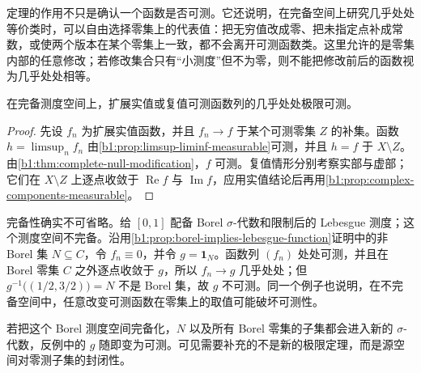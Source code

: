 定理的作用不只是确认一个函数是否可测。它还说明，在完备空间上研究几乎处处等价类时，可以自由选择零集上的代表值：把无穷值改成零、把未指定点补成常数，或使两个版本在某个零集上一致，都不会离开可测函数类。这里允许的是零集内部的任意修改；若修改集合只有“小测度”但不为零，则不能把修改前后的函数视为几乎处处相等。

\begin{corollary}
\label{b1:cor:ae-limit-measurable}
在完备测度空间上，扩展实值或复值可测函数列的几乎处处极限可测。
\end{corollary}
\begin{proof}
先设 \(f_n\) 为扩展实值函数，并且 \(f_n\to f\) 于某个可测零集 \(Z\) 的补集。函数
\(h=\limsup_nf_n\) 由\cref{b1:prop:limsup-liminf-measurable}可测，并且 \(h=f\) 于 \(X\setminus Z\)。由\cref{b1:thm:complete-null-modification}，\(f\) 可测。复值情形分别考察实部与虚部；它们在 \(X\setminus Z\) 上逐点收敛于 \(\operatorname{Re}f\) 与 \(\operatorname{Im}f\)，应用实值结论后再用\cref{b1:prop:complex-components-measurable}。
\end{proof}

完备性确实不可省略。给 \([0,1]\) 配备 Borel \(\sigma\)-代数和限制后的 Lebesgue 测度；这个测度空间不完备。沿用\cref{b1:prop:borel-implies-lebesgue-function}证明中的非 Borel 集 \(N\subseteq C\)，令 \(f_n\equiv0\)，并令 \(g=\mathbf 1_N\)。函数列 \((f_n)\) 处处可测，并且在 Borel 零集 \(C\) 之外逐点收敛于 \(g\)，所以 \(f_n\to g\) 几乎处处；但 \(g^{-1}\bigl((1/2,3/2)\bigr)=N\) 不是 Borel 集，故 \(g\) 不可测。同一个例子也说明，在不完备空间中，任意改变可测函数在零集上的取值可能破坏可测性。

\ProseParagraphBreak

若把这个 Borel 测度空间完备化，\(N\) 以及所有 Borel 零集的子集都会进入新的 \(\sigma\)-代数，反例中的 \(g\) 随即变为可测。可见需要补充的不是新的极限定理，而是源空间对零测子集的封闭性。
